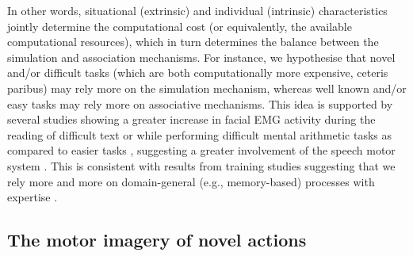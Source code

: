 \documentclass[utf8]{template/frontiersSCNS} %
\begin{document}
In other words, situational (extrinsic) and individual (intrinsic) characteristics jointly determine the computational cost (or equivalently, the available computational resources), which in turn determines the balance between the simulation and association mechanisms. For instance, we hypothesise that novel and/or difficult tasks (which are both computationally more expensive, ceteris paribus) may rely more on the simulation mechanism, whereas well known and/or easy tasks may rely more on associative mechanisms. This idea is supported by several studies showing a greater increase in facial EMG activity during the reading of difficult text or while performing difficult mental arithmetic tasks as compared to easier tasks \citep[e.g.,][]{faaborg-andersen_electromyography_1958, sokolov_inner_1972}, suggesting a greater involvement of the speech motor system \citep[and/or a lesser involvement of inhibitory mechanisms, see also the discussion in][]{nalborczyk_understanding_2019-1, nalborczyk_re-analysing_2020}. This is consistent with results from training studies suggesting that we rely more and more on domain-general (e.g., memory-based) processes with expertise \citep[e.g.,][]{tarr_mental_1989, jolicoeur_time_1985}.


\subsection{The motor imagery of novel actions}
\end{document}
